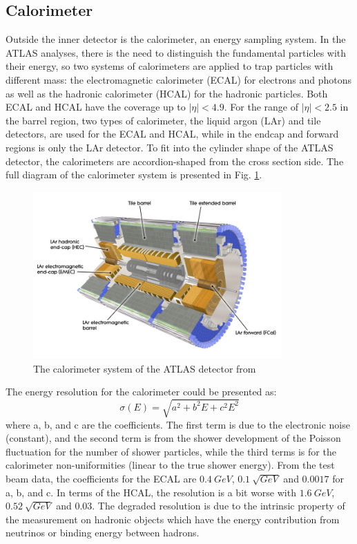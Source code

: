 \subsection{Calorimeter}
Outside the inner detector is the calorimeter, an energy sampling system. In the ATLAS analyses, there is the need to distinguish the fundamental particles with their energy, so two systems of calorimeters are applied to trap particles with different mass: the electromagnetic calorimeter (ECAL) for electrons and photons as well as the hadronic calorimeter (HCAL) for the hadronic particles. Both ECAL and HCAL have the coverage up to $|\eta|<4.9$. For the range of $|\eta|<2.5$ in the barrel region, two types of calorimeter, the liquid argon (LAr) and tile detectors, are used for the ECAL and HCAL, while in the endcap and forward regions is only the LAr detector. To fit into the cylinder shape of the ATLAS detector, the calorimeters are accordion-shaped from the cross section side. The full diagram of the calorimeter system is presented in Fig. \ref{Fig:calorimeter}. 
\begin{figure}[!h]                %
	\includegraphics[width=0.85\textwidth]{Chapter2/calorimeter}
	\centering
	\begin{center}
		\caption{The calorimeter system of the ATLAS detector from \cite{Aad:2008zzm}}
		\label{Fig:calorimeter}            
	\end{center}
\end{figure}
The energy resolution for the calorimeter could be presented as:
\begin{equation}
\sigma (E)=\sqrt{a^{2}+b^{2}E+c^{2}E^{2}}
\end{equation}
where a, b, and c are the coefficients. The first term is due to the electronic noise (constant), and the second term is from the shower development of the Poisson fluctuation for the number of shower particles, while the third terms is for the calorimeter non-uniformities (linear to the true shower energy). From the test beam data, the coefficients for the ECAL are $0.4~GeV$, $0.1~\sqrt{GeV}$ and $0.0017$ for a, b, and c. In terms of the HCAL, the resolution is a bit worse with $1.6~GeV$, $0.52~\sqrt{GeV}$ and $0.03$. The degraded resolution is due to the intrinsic property of the measurement on hadronic objects which have the energy contribution from neutrinos or binding energy between hadrons. 
